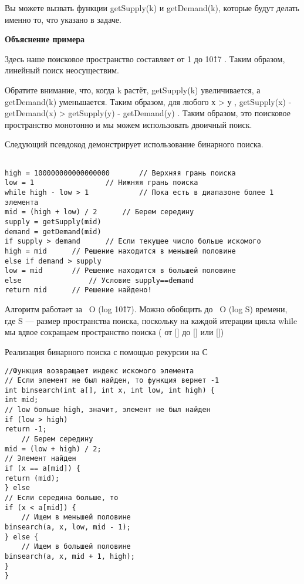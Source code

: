 Вы можете вызвать функции getSupply(k) и getDemand(k), которые будут делать именно то, что указано в задаче.

\vspace{\baselineskip}
\textbf{Объяснение примера}
\vspace{\baselineskip}

Здесь наше поисковое пространство составляет от 1 до 10\^17 . Таким образом, линейный поиск неосуществим.

\vspace{\baselineskip}
Обратите внимание, что, когда k растёт, getSupply(k) увеличивается, а getDemand(k) уменьшается. Таким образом, для любого х > у , getSupply(x) - getDemand(x) > getSupply(y) - getDemand(y) . Таким образом, это поисковое пространство монотонно и мы можем использовать двоичный поиск.

\vspace{\baselineskip}
Следующий псевдокод демонстрирует использование бинарного поиска.

\vspace{\baselineskip}
\begin{verbatim} 	
	
high = 100000000000000000		// Верхняя грань поиска
low = 1					// Нижняя грань поиска
while high - low > 1			// Пока есть в диапазоне более 1 элемента
mid = (high + low) / 2		// Берем середину
supply = getSupply(mid)			
demand = getDemand(mid)
if supply > demand		// Если текущее число больше искомого
high = mid		// Решение находится в меньшей половине
else if demand > supply		
low = mid		// Решение находится в большей половине
else				// Условие supply==demand
return mid		// Решение найдено!

\end{verbatim}


\newpage
Алгоритм работает за ~O (log 10\^17). Можно обобщить до ~O (log S) времени, где S --- размер пространства поиска, поскольку на каждой итерации цикла while мы вдвое сокращаем пространство поиска ( от [] до  [] или  [])

\vspace{\baselineskip}
Реализация бинарного поиска с помощью рекурсии на С
\vspace{\baselineskip}

\begin{verbatim} 
//Функция возвращает индекс искомого элемента
// Если элемент не был найден, то функция вернет -1
int binsearch(int a[], int x, int low, int high) {
int mid;
// low больше high, значит, элемент не был найден
if (low > high)
return -1;
	// Берем середину
mid = (low + high) / 2;
// Элемент найден
if (x == a[mid]) {
return (mid);
} else
// Если середина больше, то
if (x < a[mid]) {
	// Ищем в меньшей половине
binsearch(a, x, low, mid - 1);
} else {
	// Ищем в большей половине
binsearch(a, x, mid + 1, high);
}
}
\end{verbatim}
\vspace{\baselineskip}

